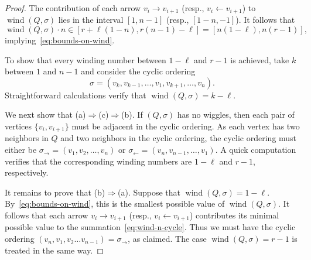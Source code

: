 \documentclass[11pt, letterpaper]{amsart}
\newcommand{\hide}[1]{}
\theoremstyle{definition}
\numberwithin{equation}{section}
\def\wind{{\operatorname{wind}}}
\begin{document}
\begin{proof}
The contribution of each  arrow $v_i \rightarrow v_{i+1}$ (resp., $v_i \leftarrow v_{i+1}$) 
to $\wind(Q,\sigma)$ lies in the interval $[1,n-1]$ (resp., $[1-n,-1]$). 
It follows that 
\begin{equation*}
\wind(Q,\sigma)\cdot n \in [r+\ell(1-n), r(n-1)-\ell]=[n(1-\ell),n(r-1)], 
\end{equation*}
implying~\eqref{eq:bounds-on-wind}. 

To show that every winding number between $1-\ell$ and $r-1$ is achieved, 
take $k$ between $1$ and $n-1$ and consider the cyclic ordering 
\begin{equation*}
\sigma=(v_k, v_{k-1}, \dots, v_1, v_{k+1}, \ldots, v_n). 
\end{equation*}
Straightforward calculations verify that $\wind(Q,\sigma)=k-\ell$. 

We next show that (a)$\Rightarrow$(c)$\Rightarrow$(b). 
If $(Q,\sigma)$ has no wiggles, then each pair of vertices $\{v_i, v_{i+1}\}$ must be adjacent in the cyclic ordering.
As each vertex has two neighbors in $Q$ and two neighbors in the cyclic ordering, 
the cyclic ordering must either be $\sigma_\rightarrow=(v_1, v_2, \ldots, v_n)$ 
or $\sigma_\leftarrow=(v_n, v_{n-1}, \dots, v_1)$.
A quick computation verifies that the corresponding winding numbers are $1-\ell$ and $r-1$, respectively.

It remains to prove that (b)$\Rightarrow$(a). 
Suppose that $\wind(Q,\sigma)=1-\ell$. 
By~\eqref{eq:bounds-on-wind}, this is the smallest possible value of $\wind(Q,\sigma)$. 
It follows that each arrow $v_i \rightarrow v_{i+1}$ (resp., $v_i \leftarrow v_{i+1}$) contributes its minimal possible value to the summation~\eqref{eq:wind-n-cycle}. 
Thus we must have the cyclic ordering $(v_n, v_1, v_2 \ldots
v_{n-1}) = \sigma_\rightarrow$, as claimed.
%
The case $\wind(Q,\sigma)=r-1$ is treated in the same way. 
%
\hide{Each edge $v_i \rightarrow v_{i+1}$ contributes between $\frac 1 n$ and $\frac{n-1}{n}$ to the winding number sum, while each edge $v_i \leftarrow v_{i+1}$ contributes between $-\frac{n-1}{n}$ and$ -\frac 1 n$.
Thus the winding number is bounded above by $\frac{n-1}{n} r - \frac l n = r-1,$ and the minimum winding number is similarly bounded below by $1-l$.
So we must achieve exactly these values for $w(\sigma, v_i, v_{i+1})$}
\end{proof}
\end{document}
